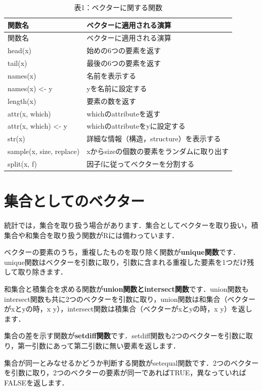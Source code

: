 \documentclass[
  letterpaper,
  DIV=11,
  numbers=noendperiod]{scrreprt}
\begin{document}
\begin{longtable}[]{@{}ll@{}}
\caption{表1：ベクターに関する関数}\tabularnewline
\toprule()
関数名 & ベクターに適用される演算 \\
\midrule()
\endfirsthead
\toprule()
関数名 & ベクターに適用される演算 \\
\midrule()
\endhead
head(x) & 始めの6つの要素を返す \\
tail(x) & 最後の6つの要素を返す \\
names(x) & 名前を表示する \\
names(x) \textless- y & yを名前に設定する \\
length(x) & 要素の数を返す \\
attr(x, which) & whichのattributeを返す \\
attr(x, which) \textless- y & whichのattributeをyに設定する \\
str(x) & 詳細な情報（構造，structure）を表示する \\
sample(x, size, replace) & xからsizeの個数の要素をランダムに取り出す \\
split(x, f) & 因子fに従ってベクターを分割する \\
\bottomrule()
\end{longtable}

\hypertarget{ux96c6ux5408ux3068ux3057ux3066ux306eux30d9ux30afux30bfux30fc}{%
\section{集合としてのベクター}\label{ux96c6ux5408ux3068ux3057ux3066ux306eux30d9ux30afux30bfux30fc}}

統計では，集合を取り扱う場合があります．集合としてベクターを取り扱い，積集合や和集合を取り扱う関数がRには備わっています．

ベクターの要素のうち，重複したものを取り除く関数が\textbf{unique関数}です．unique関数はベクターを引数に取り，引数に含まれる重複した要素を1つだけ残して取り除きます．

和集合と積集合を求める関数が\textbf{union関数とintersect関数}です．union関数もintersect関数も共に2つのベクターを引数に取り，union関数は和集合（ベクターがxとyの時，x
\cup y），intersect関数は積集合（ベクターがxとyの時，x
\cap y）を返します．

集合の差を示す関数が\textbf{setdiff関数}です．setdiff関数も2つのベクターを引数に取り，第一引数にあって第二引数に無い要素を返します．

集合が同一とみなせるかどうか判断する関数がsetequal関数です．2つのベクターを引数に取り，2つのベクターの要素が同一であればTRUE，異なっていればFALSEを返します．
\end{document}

